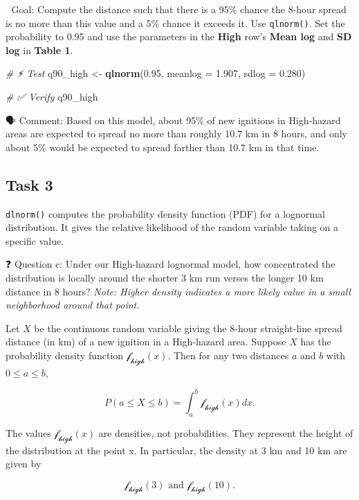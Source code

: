 \documentclass[
  12pt,
]{scrreprt}
\newenvironment{Shaded}{\begin{snugshade}}{\end{snugshade}}
\newcommand{\AttributeTok}[1]{\textcolor[rgb]{0.13,0.29,0.53}{#1}}
\newcommand{\CommentTok}[1]{\textcolor[rgb]{0.56,0.35,0.01}{\textit{#1}}}
\newcommand{\FloatTok}[1]{\textcolor[rgb]{0.00,0.00,0.81}{#1}}
\newcommand{\FunctionTok}[1]{\textcolor[rgb]{0.13,0.29,0.53}{\textbf{#1}}}
\newcommand{\NormalTok}[1]{#1}
\newcommand{\OtherTok}[1]{\textcolor[rgb]{0.56,0.35,0.01}{#1}}
\begin{document}
🎯 Goal: Compute the distance such that there is a 95\% chance the 8-hour spread is no more than this value and a 5\% chance it exceeds it. Use \texttt{qlnorm()}. Set the probability to 0.95 and use the parameters in the \textbf{High} row's \textbf{Mean log} and \textbf{SD log} in \textbf{Table 1}.

\begin{Shaded}
\begin{Highlighting}[]
\CommentTok{\# ⚡ Test}
\NormalTok{q90\_high }\OtherTok{\textless{}{-}} \FunctionTok{qlnorm}\NormalTok{(}\FloatTok{0.95}\NormalTok{, }\AttributeTok{meanlog =} \FloatTok{1.907}\NormalTok{, }\AttributeTok{sdlog =} \FloatTok{0.280}\NormalTok{)}
\end{Highlighting}
\end{Shaded}

\begin{Shaded}
\begin{Highlighting}[]
\CommentTok{\# ✅  Verify}
\NormalTok{q90\_high}
\end{Highlighting}
\end{Shaded}

🗣 Comment: Based on this model, about 95\% of new ignitions in High-hazard areas are expected to spread no more than roughly 10.7 km in 8 hours, and only about 5\% would be expected to spread farther than 10.7 km in that time.

\subsection{Task 3}\label{task-3-1}

\texttt{dlnorm()} computes the probability density function (PDF) for a lognormal distribution. It gives the relative likelihood of the random variable taking on a specific value.

❓ Question c: Under our High-hazard lognormal model, how concentrated the distribution is locally around the shorter 3 km run verses the longer 10 km distance in 8 hours? \emph{Note: Higher density indicates a more likely value in a small neighborhood around that point.}

\begin{customtextbox}

Let $X$ be the continuous random variable giving the 8-hour straight-line spread distance (in km) of a new ignition in a High-hazard area. Suppose $X$ has the probability density function $\mathcal{f_{high}}(x)$. Then for any two distances $a$ and $b$ with $0 \leq a \leq b$,

$$ P(a \leq X \leq b) = \int_{a}^{b} \mathcal{f_{high}}(x) dx. $$

The values $\mathcal{f_{high}}(x)$ are densities, not probabilities. They represent the height of the distribution at the point x. In particular, the density at 3 km and 10 km are given by

$$ \mathcal{f_{high}}(3) \text{ and } \mathcal{f_{high}}(10). $$

\end{customtextbox}
\end{document}
